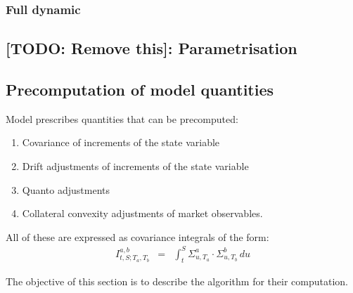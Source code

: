 \documentclass[11pt,english]{amsart}
\theoremstyle{definition}
\begin{document}
\subsubsection{Full dynamic}%


\subsection{[TODO: Remove this]: Parametrisation}



\newpage%
\subsection{Precomputation of model quantities}

Model prescribes quantities that can be precomputed:
\begin{enumerate}
\item Covariance of increments of the state variable
\item Drift adjustments of increments of the state variable
\item Quanto adjustments 
\item Collateral convexity adjustments of market observables.
\end{enumerate}
All of these are expressed as covariance integrals of the form:
\begin{eqnarray}
  I^{a,b}_{t,S;T_a,T_b} &=& \int_t^S \Sigma^a_{u,T_a} \cdot \Sigma^b_{u,T_b} \, du 
\end{eqnarray}

The objective of this section is to describe the algorithm for their computation.


\subsubsection{}
\end{document}
